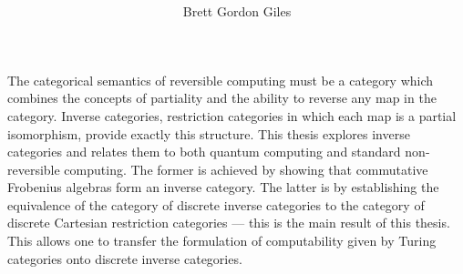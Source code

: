 \documentclass{ucalgthes1}
\title{\thesistitle \\
\bigskip  }
\author{Brett Gordon Giles}
\newcommand{\thesistitle}{An investigation of some theoretical aspects of reversible computing}
\begin{document}
\makethesistitle
{}     %
\setcounter{page}{1}
%
\newpage
{}
{}
The categorical semantics of reversible computing must be a category which combines the concepts of
partiality and the ability to reverse any map in the category. Inverse categories, restriction
categories in which each map is a partial isomorphism, provide exactly this structure. This thesis
explores inverse categories and relates them to both quantum computing and standard non-reversible
computing. The former is achieved by showing that commutative Frobenius algebras form an inverse
category. The latter is by establishing the equivalence of the category of discrete inverse
categories to the category of discrete Cartesian restriction categories --- this is the main result
of this thesis. This allows one to transfer the formulation of computability given by Turing
categories onto discrete inverse categories.
\end{document}
